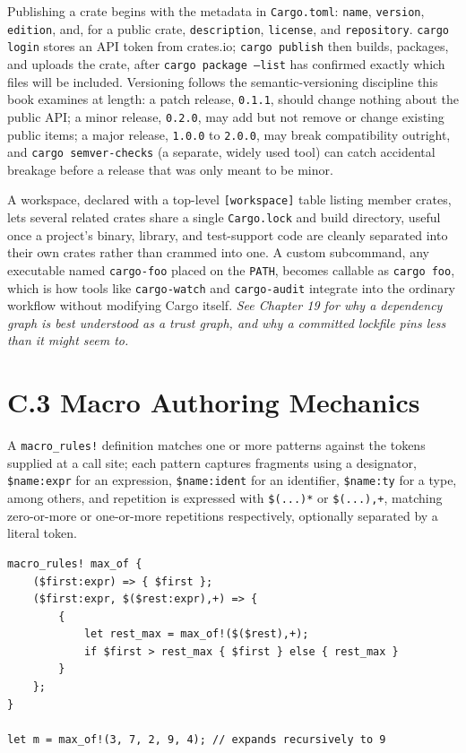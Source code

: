 \documentclass[11pt]{book}
\begin{document}
Publishing a crate begins with the metadata in \texttt{Cargo.toml}: \texttt{name}, \texttt{version}, \texttt{edition}, and, for a public crate, \texttt{description}, \texttt{license}, and \texttt{repository}. \texttt{cargo login} stores an API token from crates.io; \texttt{cargo publish} then builds, packages, and uploads the crate, after \texttt{cargo package --list} has confirmed exactly which files will be included. Versioning follows the semantic-versioning discipline this book examines at length: a patch release, \texttt{0.1.1}, should change nothing about the public API; a minor release, \texttt{0.2.0}, may add but not remove or change existing public items; a major release, \texttt{1.0.0} to \texttt{2.0.0}, may break compatibility outright, and \texttt{cargo semver-checks} (a separate, widely used tool) can catch accidental breakage before a release that was only meant to be minor.

A workspace, declared with a top-level \texttt{[workspace]} table listing member crates, lets several related crates share a single \texttt{Cargo.lock} and build directory, useful once a project's binary, library, and test-support code are cleanly separated into their own crates rather than crammed into one. A custom subcommand, any executable named \texttt{cargo-foo} placed on the \texttt{PATH}, becomes callable as \texttt{cargo foo}, which is how tools like \texttt{cargo-watch} and \texttt{cargo-audit} integrate into the ordinary workflow without modifying Cargo itself. \emph{See Chapter 19 for why a dependency graph is best understood as a trust graph, and why a committed lockfile pins less than it might seem to.}

\section*{C.3 Macro Authoring Mechanics}

A \texttt{macro\_rules!} definition matches one or more patterns against the tokens supplied at a call site; each pattern captures fragments using a designator, \texttt{\$name:expr} for an expression, \texttt{\$name:ident} for an identifier, \texttt{\$name:ty} for a type, among others, and repetition is expressed with \texttt{\$(...)*} or \texttt{\$(...),+}, matching zero-or-more or one-or-more repetitions respectively, optionally separated by a literal token.

\begin{lstlisting}
macro_rules! max_of {
    ($first:expr) => { $first };
    ($first:expr, $($rest:expr),+) => {
        {
            let rest_max = max_of!($($rest),+);
            if $first > rest_max { $first } else { rest_max }
        }
    };
}

let m = max_of!(3, 7, 2, 9, 4); // expands recursively to 9
\end{lstlisting}
\end{document}
